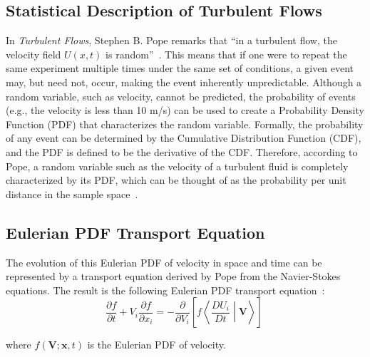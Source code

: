 \documentclass[12pt, onecolumn, journal]{IEEEtran}
\begin{document}
\subsection{Statistical Description of Turbulent Flows}
In \textit{Turbulent Flows}, Stephen B. Pope remarks that “in a turbulent flow, the velocity field $U(x,t)$ is random”~\cite{Pope2000}. This means that if one were to repeat the same experiment multiple times under the same set of conditions, a given event may, but need not, occur, making the event inherently unpredictable. Although a random variable, such as velocity, cannot be predicted, the probability of events (e.g., the velocity is less than 10 m/s) can be used to create a Probability Density Function (PDF) that characterizes the random variable. Formally, the probability of any event can be determined by the Cumulative Distribution Function (CDF), and the PDF is defined to be the derivative of the CDF. Therefore, according to Pope, a random variable such as the velocity of a turbulent fluid is completely characterized by its PDF, which can be thought of as the probability per unit distance in the sample space~\cite{Pope2000}.


\subsection{Eulerian PDF Transport Equation}
The evolution of this Eulerian PDF of velocity in space and time can be represented by a transport equation derived by Pope from the Navier-Stokes equations. The result is the following Eulerian PDF transport equation~\cite{Pope2000}:
\begin{equation}
    \frac{\partial f}{\partial t} + V_i \frac{\partial f}{\partial x_i} = - \frac{\partial}{\partial V_i} \left[f \left \langle \frac{DU_i}{Dt} \middle| \mathbf{V} \right \rangle \right]\
    \label{eq:eulerian_pdf}
\end{equation}

where $f(\mathbf{V}; \mathbf{x}, t)$ is the Eulerian PDF of velocity.
\end{document}
